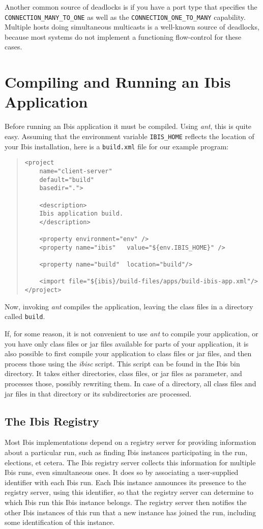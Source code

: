 \documentclass[10pt]{article}
\newcommand{\mysection}[1]{\section{#1}\label{#1}}
\newcommand{\mysubsection}[1]{\subsection{#1}\label{#1}}
\begin{document}
Another common source of deadlocks is if you have a port type that
specifies the \texttt{CONNECTION\_MANY\_TO\_ONE} as well as the
\texttt{CONNECTION\_ONE\_TO\_MANY} capability.
Multiple hosts doing simultaneous multicasts
is a well-known source of deadlocks, because most systems do not
implement a functioning flow-control for these cases.

\mysection{Compiling and Running an Ibis Application}

Before running an Ibis application it must be compiled.  Using
\emph{ant}, this is quite easy. Assuming that the environment variable
\texttt{IBIS\_HOME} reflects the location of your Ibis installation,
here is a \texttt{build.xml} file for our example program:

{\small
\begin{quote}
\begin{verbatim}
<project
    name="client-server"
    default="build"
    basedir=".">

    <description>
    Ibis application build.
    </description>

    <property environment="env" />
    <property name="ibis"   value="${env.IBIS_HOME}" />

    <property name="build"  location="build"/>

    <import file="${ibis}/build-files/apps/build-ibis-app.xml"/>
</project>
\end{verbatim}
\end{quote}
}

Now, invoking \emph{ant} compiles the application, leaving the class files
in a directory called \texttt{build}.

If, for some reason, it is not convenient to use \emph{ant} to compile
your application, or you have only class files or jar files available
for parts of your application, it is also possible to first compile
your application to class files or jar files, and then process those
using the \emph{ibisc} script. This script can be found in the Ibis
bin directory. It takes either directories, class files, or jar files
as parameter, and processes those, possibly rewriting them. In case
of a directory, all class files and jar files in that directory or
its subdirectories are processed.

\mysubsection{The Ibis Registry}

Most Ibis implementations depend on a registry server for providing
information about a particular run, such as finding Ibis instances
participating in the run, elections, et cetera.
The Ibis registry server collects this information for multiple Ibis
runs, even simultaneous ones. It does so by associating a user-supplied
identifier with each Ibis run. Each Ibis instance announces its
presence to the registry server, using this identifier, so that the
registry server can determine to which Ibis run this Ibis instance belongs.
The registry server then notifies the other Ibis instances of this run that
a new instance has joined the run, including some identification of
this instance.
\end{document}
